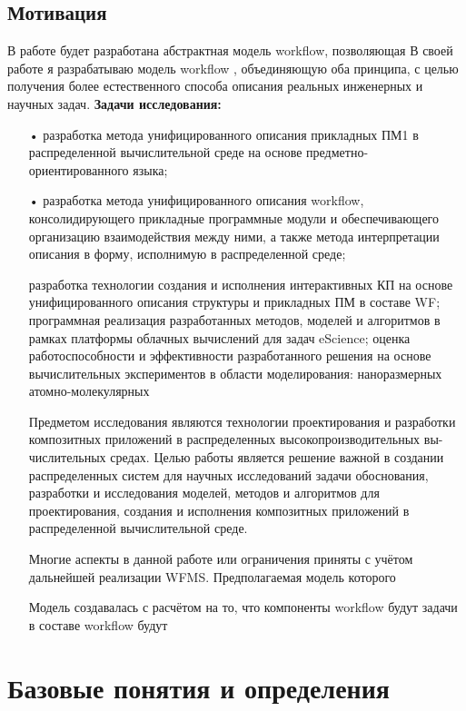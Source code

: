 \documentclass[a4paper,14pt]{article}
\begin{document}
\subsection{Мотивация}
 В работе будет разработана абстрактная модель workflow, позволяющая 
  В своей работе я разрабатываю  модель  workflow , 
объединяющую оба принципа, с целью получения более естественного способа
описания реальных инженерных и научных задач. 
\textbf{Задачи исследования:}
\begin{enumerate}
\item[•] разработка метода унифицированного описания прикладных ПМ1 в распределенной вычислительной среде на основе предметно-ориентированного языка;
\item[•]разработка метода унифицированного описания workflow, консолидирующего прикладные программные модули и обеспечивающего
организацию взаимодействия между ними, а также метода интерпретации описания в форму, исполнимую в распределенной среде;

разработка технологии создания и исполнения интерактивных КП на основе
унифицированного описания структуры и прикладных ПМ в составе WF;
программная реализация разработанных методов, моделей и алгоритмов в рамках платформы облачных вычислений для задач eScience;
оценка работоспособности и эффективности разработанного решения на основе вычислительных экспериментов в области моделирования: наноразмерных
атомно-молекулярных 

Предметом исследования являются технологии проектирования и разработки композитных приложений в распределенных высокопроизводительных вы-
числительных средах.
Целью работы является решение важной в создании распределенных систем для научных исследований задачи обоснования, разработки и исследования
моделей, методов и алгоритмов для проектирования, создания и исполнения композитных приложений в распределенной вычислительной среде.


Многие аспекты в данной работе или ограничения приняты с учётом дальнейшей реализации WFMS. Предполагаемая модель которого


Модель создавалась с расчётом на то, что компоненты workflow будут задачи в составе workflow будут 

\end{enumerate}

\section{Базовые понятия и определения}
\end{document}
